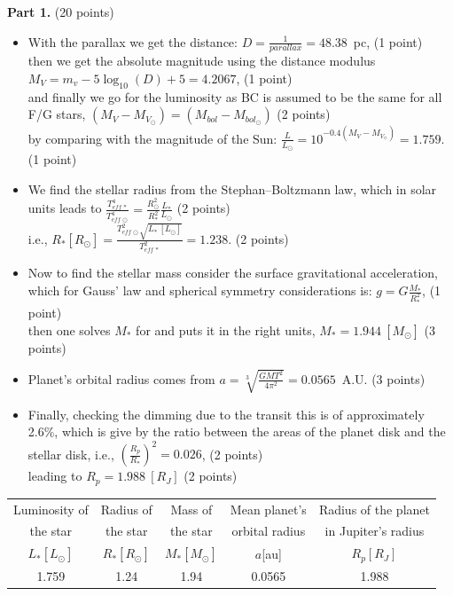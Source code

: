 \noindent\textbf{Part 1.} \hfill(20 points)

\begin{itemize}
\item With the parallax we get the distance:
$D = \frac{1}{parallax} = 48.38$~pc, \hfill(1 point)\\
then we get the absolute magnitude using the distance modulus
$M_V = m_v - 5\log_{10}(D) + 5 = 4.2067$, \hfill(1 point)\\
and finally we go for the luminosity as BC is assumed to be the same for all
F/G stars, $(M_V - M_{V_\odot}) = (M_{bol} - M_{bol_\odot})$ \hfill(2 points)\\
by comparing with the magnitude of the Sun:
$\frac{L}{L_\odot} = 10^{-0.4(M_V - M_{V_\odot})} = 1.759$. \hfill(1 point)
\item We find the stellar radius from the Stephan--Boltzmann
law, which in solar units leads to
$\frac{T_{eff\,*}^4}{T_{eff\,\odot}^4}
 = \frac{R_\odot^2}{R_*^2}\frac{L_*}{L_\odot}$ \hfill(2 points)\\
i.e.,
$R_*[R_\odot] = \frac{T_{eff\,\odot}^2\sqrt{L_*\,[L_\odot]}}{T_{eff\,*}^2}
 = 1.238$. \hfill(2 points)
\item Now to find the stellar mass consider the surface gravitational
acceleration, which for Gauss' law and spherical symmetry considerations is:
$g = G\frac{M_*}{R_*^2}$, \hfill(1 point)\\
then one solves $M_*$ for and puts it in the right units,
$M_* = 1.944\ [M_\odot]$ \hfill(3 points)
\item Planet's orbital radius comes from
$a = \sqrt[3]{\frac{GMT^2}{4\pi^2}} = 0.0565$~A.U. \hfill(3 points)
\item Finally, checking the dimming due to the transit this is of
approximately 2.6\%, which is give
by the ratio between the areas of the planet disk and the stellar disk, i.e.,
$\left(\frac{R_p}{R_*}\right)^2 = 0.026$, \hfill(2 points)\\
leading to $R_p = 1.988\ [R_J]$ \hfill(2 points)
\end{itemize}

\begin{center}
\begin{tabular}{ccccc}
\toprule
Luminosity of & Radius of & Mass of & Mean planet's & Radius of the planet\\
the star & the star & the star & orbital radius & in Jupiter's radius\\
$L_*[L_\odot]$ & $R_*[R_\odot]$ & $M_*[M_\odot]$ & $a$[au] & $R_p[R_J]$\\
\midrule
1.759 & 1.24 & 1.94 & 0.0565 & 1.988\\
\bottomrule
\end{tabular}
\end{center}

